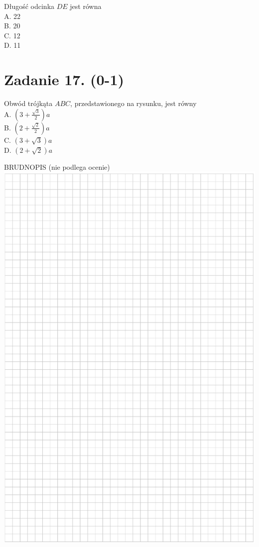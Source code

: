 \documentclass[10pt]{article}
\begin{document}
Długość odcinka \(D E\) jest równa\\
A. 22\\
B. 20\\
C. 12\\
D. 11

\section*{Zadanie 17. (0-1)}
Obwód trójkąta \(A B C\), przedstawionego na rysunku, jest równy\\
A. \(\left(3+\frac{\sqrt{3}}{2}\right) a\)\\
B. \(\left(2+\frac{\sqrt{2}}{2}\right) a\)\\
C. \((3+\sqrt{3}) a\)\\
D. \((2+\sqrt{2}) a\)

BRUDNOPIS (nie podlega ocenie)\\
\includegraphics[max width=\textwidth, center]{2024_11_21_7b5527312ea89ae66fd0g-11}
\end{document}
